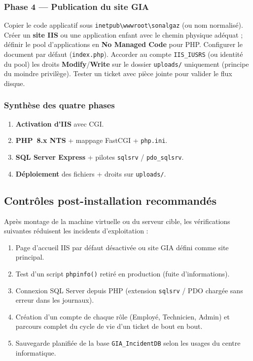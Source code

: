 \subsubsection{Phase 4 — Publication du site GIA}
Copier le code applicatif sous \texttt{inetpub\textbackslash wwwroot\textbackslash sonalgaz} (ou
nom normalisé). Créer un \textbf{site IIS} ou une application enfant avec le chemin physique
adéquat ; définir le pool d'applications en \textbf{No Managed Code} pour PHP. Configurer le
document par défaut (\texttt{index.php}). Accorder au compte \texttt{IIS\_IUSRS} (ou identité du
pool) les droits \textbf{Modify}/\textbf{Write} sur le dossier \texttt{uploads/} uniquement
(principe du moindre privilège). Tester un ticket avec pièce jointe pour valider le flux disque.

\subsubsection{Synthèse des quatre phases}
\begin{enumerate}
    \item \textbf{Activation d'IIS} avec CGI.
    \item \textbf{PHP~8.x NTS} + mappage FastCGI + \texttt{php.ini}.
    \item \textbf{SQL Server Express} + pilotes \texttt{sqlsrv} / \texttt{pdo\_sqlsrv}.
    \item \textbf{Déploiement} des fichiers + droits sur \texttt{uploads/}.
\end{enumerate}

\subsection{Contrôles post-installation recommandés}
Après montage de la machine virtuelle ou du serveur cible, les vérifications suivantes réduisent
les incidents d'exploitation :
\begin{enumerate}
    \item Page d'accueil IIS par défaut désactivée ou site GIA défini comme site principal.
    \item Test d'un script \texttt{phpinfo()} retiré en production (fuite d'informations).
    \item Connexion SQL Server depuis PHP (extension \texttt{sqlsrv} / PDO chargée sans erreur
    dans les journaux).
    \item Création d'un compte de chaque rôle (Employé, Technicien, Admin) et parcours complet
    du cycle de vie d'un ticket de bout en bout.
    \item Sauvegarde planifiée de la base \texttt{GIA\_IncidentDB} selon les usages du centre
    informatique.
\end{enumerate}

